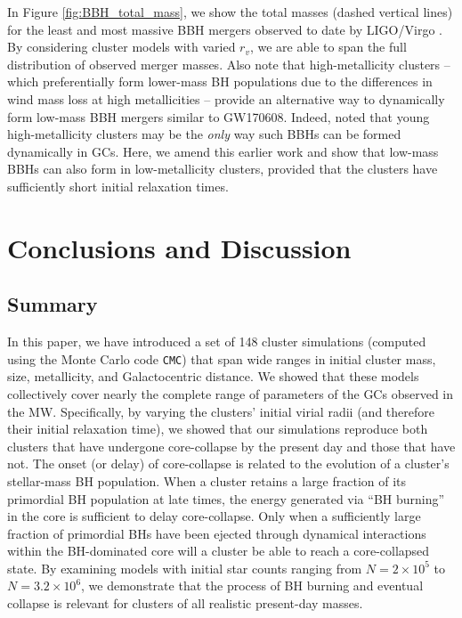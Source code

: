 \documentclass[twocolumn,tighten]{aastex63}
\begin{document}
In Figure \ref{fig:BBH_total_mass}, we show the total masses (dashed vertical lines) for the least and most massive BBH mergers observed to date by LIGO/Virgo \citep{LIGO2018a}. By considering cluster models with varied $r_v$, we are able to span the full distribution of observed merger masses. Also note that high-metallicity clusters -- which preferentially form lower-mass BH populations due to the differences in wind mass loss at high metallicities -- provide an alternative way to dynamically form low-mass BBH mergers similar to GW170608. Indeed, \citet{Chatterjee2017b} noted that young high-metallicity clusters may be the \textit{only} way such BBHs can be formed dynamically in GCs. Here, we amend this earlier work and show that low-mass BBHs can also form in low-metallicity clusters, provided that the clusters have sufficiently short initial relaxation times.

\section{Conclusions and Discussion}
\label{sec:conclusions}

\subsection{Summary}

In this paper, we have introduced a set of 148 cluster simulations (computed using the Monte Carlo code \texttt{CMC}) that span wide ranges in initial cluster mass, size, metallicity, and Galactocentric distance. We showed that these models collectively cover nearly the complete range of parameters of the GCs observed in the MW. Specifically, by varying the clusters' initial virial radii (and therefore their initial relaxation time), we showed that our simulations reproduce both clusters that have undergone core-collapse by the present day and those that have not. The onset (or delay) of core-collapse is related to the evolution of a cluster's stellar-mass BH population. When a cluster retains a large fraction of its primordial BH population at late times, the energy generated via ``BH burning'' in the core is sufficient to delay core-collapse. Only when a sufficiently large fraction of primordial BHs have been ejected through dynamical interactions within the BH-dominated core will a cluster be able to reach a core-collapsed state. By examining models with initial star counts ranging from $N=2\times10^5$ to $N=3.2\times10^6$, we demonstrate that the process of BH burning and eventual collapse is relevant for clusters of all realistic present-day masses.
\end{document}
